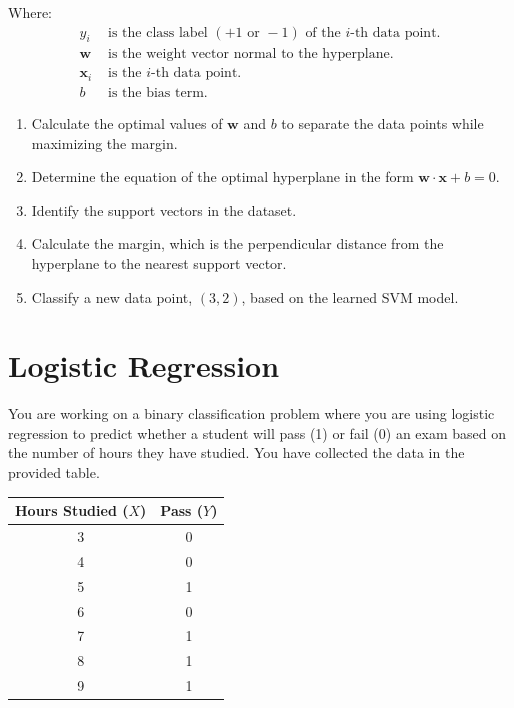 \documentclass[]{article}
\begin{document}
	Where:
	\begin{align*}
		y_i & \text{ is the class label } (+1 \text{ or } -1) \text{ of the } i\text{-th data point.} \\
		\mathbf{w} & \text{ is the weight vector normal to the hyperplane.} \\
		\mathbf{x}_i & \text{ is the } i\text{-th data point.} \\
		b & \text{ is the bias term.}
	\end{align*}
	
	\begin{enumerate}
		\item Calculate the optimal values of \(\mathbf{w}\) and \(b\) to separate the data points while maximizing the margin.
		\item Determine the equation of the optimal hyperplane in the form \(\mathbf{w}\cdot\mathbf{x} + b = 0\).
		\item Identify the support vectors in the dataset.
		\item Calculate the margin, which is the perpendicular distance from the hyperplane to the nearest support vector.
		\item Classify a new data point, \((3, 2)\), based on the learned SVM model.
	\end{enumerate}
	
	
	
	
	
	\section{Logistic Regression}
	You are working on a binary classification problem where you are using logistic regression to predict whether a student will pass (1) or fail (0) an exam based on the number of hours they have studied. You have collected the data in the provided table.
	
	\begin{table}[h!]
		\centering
		\begin{tabular}{|c|c|}
			\hline
			Hours Studied ($X$) & Pass ($Y$) \\
			\hline
			3 & 0 \\
			4 & 0 \\
			5 & 1 \\
			6 & 0 \\
			7 & 1 \\
			8 & 1 \\
			9 & 1 \\
			\hline
		\end{tabular}
	\end{table}
	
\end{document}
